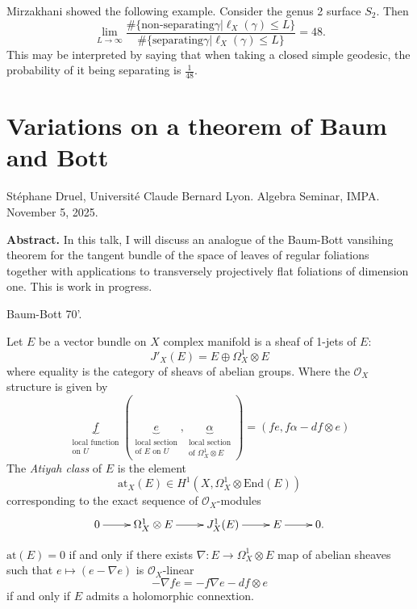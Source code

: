 Mirzakhani showed the following example.
Consider the genus 2 surface $S_2$.
Then
$$
\lim_{L \to \infty}
\frac{\#\{\text{non-separating
}\gamma|\ell_X(\gamma)\leq L\}}{
\#\{\text{separating
}\gamma|\ell_X(\gamma)\leq L\}}
=48.
$$
This may be interpreted by saying that when
taking a closed simple geodesic,
the probability of it being separating is
$\frac{1}{48}$.






\section{Variations on a theorem of Baum and
Bott}
\label{section-baum-and-bott}

\noindent
Stéphane Druel, Université Claude Bernard
Lyon.
Algebra Seminar, IMPA.
November 5, 2025.

\medskip\noindent
{\bf Abstract.}
In this talk, I will discuss an analogue of
the Baum-Bott vansihing theorem for
the tangent bundle of the space of leaves of
regular foliations together with
applications to transversely projectively
flat foliations of dimension one. This
is work in progress.

\medskip\noindent



Baum-Bott 70'.

Let $E$ be a vector bundle on $X$
complex manifold is a sheaf of 1-jets of $E$:
$$
J'_X(E)= E \oplus \Omega^1_X \otimes E
$$
where equality is the category of sheavs of
abelian groups.
Where the $\mathcal{O}_X$ structure is given
by
$$
\underbrace{f}_{\substack{\text{local
function} \\ \text{on }U}}
(\underbrace{e}_{\substack{\text{local
section} \\ \text{of $E$ on  $U$}}}
, \underbrace{\alpha}_{\substack{\text{local
section} \\
\text{of $\Omega^1_X \otimes E$}}})
=(fe,f\alpha-df \otimes e)
$$
The {\it Atiyah class} of $E$ is the element
$$
\text{at}_X(E) \in H^1(X,\Omega_X^1 \otimes
\text{End}(E))
$$
corresponding to the exact sequence of
$\mathcal{O}_X$-modules
$$
\xymatrix{
0\ar[r]&\Omega_X^1\otimes
E\ar[r]&J_X^1(E)\ar[r]&E\ar[r]&0.
}
$$

\begin{remark}
\label{remark-holomorphic-connection}
 $\text{at}(E)=0$ if and only if there exists
$\nabla:E \to \Omega^1_X \otimes E$ map of
abelian sheaves
such that $e \mapsto  (e-\nabla e)$ is
$\mathcal{O}_X$-linear
$$
-\nabla fe=-f\nabla e - df \otimes e
$$
if and only if $E$ admits a holomorphic
connextion.
\end{remark}

